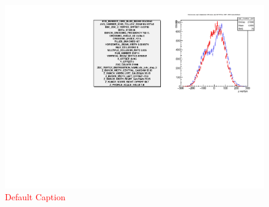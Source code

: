 \begin{figure}
\begin{center}
\includegraphics[width=\linewidth,height=\textheight,keepaspectratio]{../HourglassCorrection/figs/359711_step03_config_compare}
\caption{ \textcolor{red}{Default Caption} }
\label{fig:359711_step03_config_compare}
\end{center}
\end{figure}